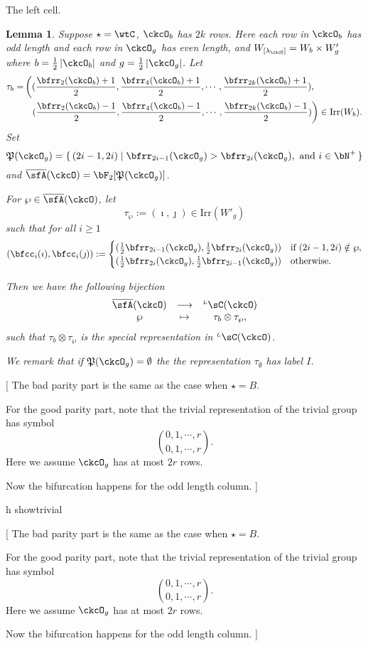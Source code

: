 \documentclass[12pt,a4paper]{amsart}
\newcommand{\trivial}[2][]{\if\relax\detokenize{#1}\relax
  {%
      \color{orange} \vspace{0em} $[$  #2 $]$
      \color{black}
  }
  \else
\ifx#1h
\ifcsname showtrivial\endcsname
{%
    \color{orange} \vspace{0em}  $[$ #2 $]$
    \color{black}
}
\fi
\else {\red Wrong argument!} \fi
\fi
}
\def\abs#1{\left|{#1}\right|}
\newcommand{\CQ}{{\mathcal {Q}}}
\numberwithin{equation}{section}
\newtheorem{lem}[thm]{Lemma}
\theoremstyle{remark}
\def\half{{\tfrac{1}{2}}}
\def\Irr{\mathrm{Irr}}
\def\WLamck{W_{[\lambda_{\ckcO}]}}
\def\LC{{}^{\scriptscriptstyle L}\sC}
\def\CQ{\overline{\sfA}}%
\def\CPP{\mathfrak{P}}
\def\sP{\wp}
\begin{document}
The left cell.
\begin{lem}
  Suppose $\star = \wtC$, $\ckcO_{b}$ has $2k$ rows. Here each row in $\ckcO_{b}$ has
  odd length and each row in $\ckcO_{g}$ has even length, and
  $\WLamck = W_{b}\times W'_{g}$ where $b=\half \abs{\ckcO_{b}}$ and
  $g = \half\abs{\ckcO_{g}}$.
  Let
  \[
    \begin{split}
      \tau_{b} =  & \left( (\frac{\bfrr_{2}(\ckcO_{b})+1}{2}, \frac{\bfrr_{4}(\ckcO_{b})+1}{2}, \cdots, \frac{\bfrr_{2k}(\ckcO_{b})+1}{2}),\right.\\
        &\ \ \left. (\frac{\bfrr_{2}(\ckcO_{b})-1}{2}, \frac{\bfrr_{4}(\ckcO_{b})-1}{2}, \cdots, \frac{\bfrr_{2k}(\ckcO_{b})-1}{2})\right) \in \Irr(W_{b}).
    \end{split}
  \]
  Set
  \[
    \CPP(\ckcO_{g}) = \set{(2i-1,2i)| \bfrr_{2i-1}(\ckcO_{g})> \bfrr_{2i}(\ckcO_{g}), \text{
        and } i\in \bN^{+}}
  \]
  and $\CQ(\ckcO)= \bF_{2}[\CPP(\ckcO_{g})]$.

  For $\sP \in \CQ(\ckcO)$, let
  \[
    \tau_{\sP} := (\imath,\jmath) \in \Irr(W'_{g})
  \]
  such that for all $i\geq 1$
  \[
  (\bfcc_{i}(\imath), \bfcc_{i}(\jmath)):=
  \begin{cases}
    (\half \bfrr_{2i-1}(\ckcO_{g}), \half \bfrr_{2i}(\ckcO_{g}))
    & \text{if } (2i-1,2i)\notin \sP,\\
    (\half \bfrr_{2i}(\ckcO_{g}),\half \bfrr_{2i-1}(\ckcO_{g})) & \text{otherwise.}
  \end{cases}
  \]

  Then we have the following bijection
  \[
    \begin{array}{ccc}
      \CQ(\ckcO) &\longrightarrow & \LC(\ckcO)\\
      \sP & \mapsto & \tau_{b}\otimes \tau_{\sP},
    \end{array}
  \]
  such that $\tau_{b}\otimes \tau_{\sP}$ is the special representation in
  $\LC(\ckcO)$.

  We remark that if $\CPP(\ckcO_{g})=\emptyset$ the the
  representation $\tau_{\emptyset}$ has label $I$.
\end{lem}

\trivial{
  The bad parity part is the same as the case when $\star= B$.


  For the good parity part, note that the trivial representation of
  the trivial group has symbol
  \[
    \binom{0,1,\cdots, r}{0,1,\cdots, r}.
  \]
  Here we assume $\ckcO_{g}$ has at most $2r$ rows.

  Now the bifurcation happens for the odd length column.
  }
\end{document}
